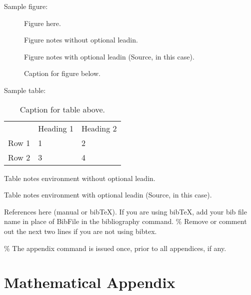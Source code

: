 \documentclass[2025 Schupf Fellowship Project]{AEA}
\begin{document}
Sample figure:

\begin{figure}
Figure here.

\caption{Caption for figure below.}
\begin{figurenotes}
Figure notes without optional leadin.
\end{figurenotes}
\begin{figurenotes}[Source]
Figure notes with optional leadin (Source, in this case).
\end{figurenotes}
\end{figure}

Sample table:

\begin{table}
\caption{Caption for table above.}

\begin{tabular}{lll}
& Heading 1 & Heading 2 \\
Row 1 & 1 & 2 \\
Row 2 & 3 & 4%
\end{tabular}
\begin{tablenotes}
Table notes environment without optional leadin.
\end{tablenotes}
\begin{tablenotes}[Source]
Table notes environment with optional leadin (Source, in this case).
\end{tablenotes}
\end{table}

References here (manual or bibTeX). If you are using bibTeX, add your
bib file name in place of BibFile in the bibliography command. \% Remove
or comment out the next two lines if you are not using bibtex.




\% The appendix command is issued once, prior to all appendices, if any.
\appendix

\section{Mathematical Appendix}
\end{document}
